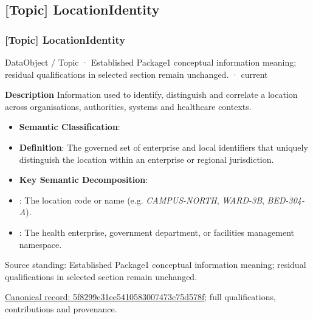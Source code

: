\subsection{[Topic] LocationIdentity}

\subsubsection{[Topic] LocationIdentity}

\label{element:5f8299e31ee5410583007473c75d578f}
{\small DataObject / Topic · Established Package1 conceptual information meaning; residual qualifications in selected section remain unchanged. · current}\par

\textbf{Description}
Information used to identify, distinguish and correlate a location across organisations, authorities, systems and healthcare contexts.



\begin{itemize}


\item \textbf{Semantic Classification}: \texttt{}

\item \textbf{Definition}: The governed set of enterprise and local identifiers that uniquely distinguish the location within an enterprise or regional jurisdiction.

\item \textbf{Key Semantic Decomposition}:

\item \texttt{}: The location code or name (e.g. \emph{CAMPUS-NORTH}, \emph{WARD-3B}, \emph{BED-304-A}).

\item \texttt{}: The health enterprise, government department, or facilities management namespace.

\end{itemize}


Source standing: Established Package1 conceptual information meaning; residual qualifications in selected section remain unchanged.


{\footnotesize \href{../../../../continuum/application/data-object/topic/5f8299e31ee5410583007473c75d578f.md}{Canonical record: 5f8299e31ee5410583007473c75d578f}; full qualifications, contributions and provenance.}\par
